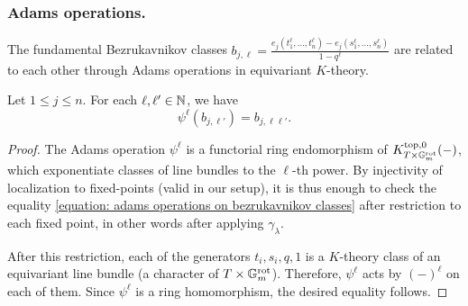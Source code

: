 \subsubsection{Adams operations.}
The fundamental Bezrukavnikov classes 
$b_{j, \ell} = \tfrac{e_j(t^{\ell}_1, \dots, t_n^{\ell}) - e_j(s^{\ell}_1, \dots, s_n^{\ell})}{1-q^{\ell}}$
are related to each other through Adams operations in equivariant $K$-theory. 
\begin{lemma}\label{lemma: adams operations on bezrukavnikov classes}
Let $1 \leq j \leq n$. For each $\ell, \ell' \in \operatorname{\mathbb{N}}$, we have
\begin{equation}\label{equation: adams operations on bezrukavnikov classes}
    \psi^{\ell}(b_{j, \ell'}) = b_{j, \ell\ell'}.
\end{equation}    
\end{lemma}
\begin{proof}
The Adams operation $\psi^{\ell}$ is a functorial ring endomorphism of $K^{\mathrm{top}, 0}_{T \times \mathbb{G}_m^{\mathrm{rot}}}(-)$, which exponentiate classes of line bundles to the $\ell$-th power.
By injectivity of localization to fixed-points (valid in our setup), it is thus enough to check the equality \eqref{equation: adams operations on bezrukavnikov classes} after restriction to each fixed point, in other words after applying $\gamma_{\lambda}$. 

After this restriction, each of the generators $t_i, s_i, q, 1$ is a $K$-theory class of an equivariant line bundle (a character of $T \times \mathbb{G}_m^{\mathrm{rot}}$). Therefore, $\psi^{\ell}$ acts by $(-)^{\ell}$ on each of them. Since $\psi^{\ell}$ is a ring homomorphism, the desired equality follows.  
\end{proof}






